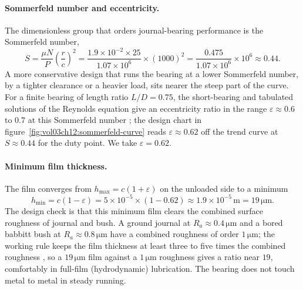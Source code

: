 \paragraph{Sommerfeld number and eccentricity.} The dimensionless
group that orders journal-bearing performance is the Sommerfeld
number,
\[
S = \frac{\mu N}{P}\left(\frac{r}{c}\right)^2 = \frac{1.9\times10^{-2}
\times25}{1.07\times10^{6}}\times(1000)^2 = \frac{0.475}{1.07\times
10^{6}}\times10^{6} \approx 0.44.
\]
A more conservative design that runs the bearing at a lower
Sommerfeld number, by a tighter clearance or a heavier load, sits
nearer the steep part of the curve. For a finite bearing of length
ratio $L/D = 0.75$, the short-bearing and tabulated solutions of the
Reynolds equation give an eccentricity ratio in the range
$\varepsilon \approx 0.6$ to $0.7$ at this Sommerfeld number
\cite{text:stachowiak-batchelor}; the design chart in
figure~\ref{fig:vol03ch12:sommerfeld-curve} reads $\varepsilon
\approx 0.62$ off the trend
curve at $S\approx0.44$ for the duty point. We take $\varepsilon =
0.62$.

\paragraph{Minimum film thickness.} The film converges from
$h_{\max} = c(1+\varepsilon)$ on the unloaded side to a minimum
\[
h_{\min} = c(1-\varepsilon) = 5\times10^{-5}\times(1-0.62) \approx
1.9\times10^{-5}\,\si{\meter} = 19\,\si{\micro\meter}.
\]
The design check is that this minimum film clears the combined surface
roughness of journal and bush. A ground journal at $R_a \approx
0.4\,\si{\micro\meter}$ and a bored babbitt bush at $R_a \approx
0.8\,\si{\micro\meter}$ have a combined roughness of order
$1\,\si{\micro\meter}$; the working rule keeps the film thickness at
least three to five times the combined roughness
\cite{text:stachowiak-batchelor}, so a $19\,\si{\micro\meter}$ film
against a $1\,\si{\micro\meter}$ roughness gives a ratio near $19$,
comfortably in full-film (hydrodynamic) lubrication. The bearing does
not touch metal to metal in steady running.

